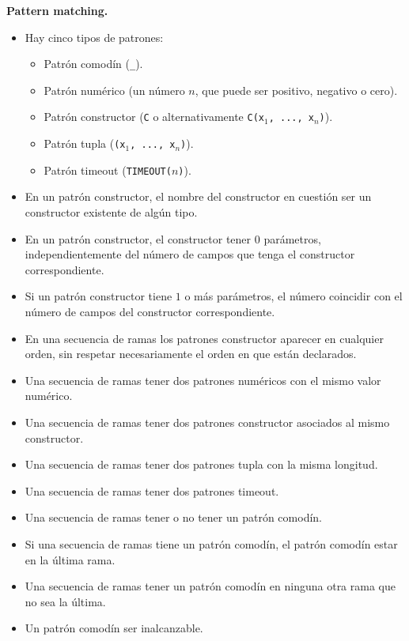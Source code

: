 \documentclass{article}
\begin{document}
{\bf Pattern matching.}
\begin{itemize}
\item Hay cinco tipos de patrones:
  \begin{itemize}
  \item Patr\'on comod\'in (\texttt{\_}).
  \item Patr\'on num\'erico (un n\'umero $n$, que puede ser positivo, negativo o cero).
  \item Patr\'on constructor (\texttt{C} o alternativamente \texttt{C(x$_1$, ..., x$_n$)}).
  \item Patr\'on tupla (\texttt{(x$_1$, ..., x$_n$)}).
  \item Patr\'on timeout (\texttt{TIMEOUT($n$)}).
  \end{itemize}
\item En un patr\'on constructor, el nombre del constructor en cuesti\'on \DEBE ser un constructor existente de
      alg\'un tipo.
\item En un patr\'on constructor, el constructor \PUEDE tener $0$ par\'ametros, independientemente del n\'umero
      de campos que tenga el constructor correspondiente.
\item Si un patr\'on constructor tiene $1$ o m\'as par\'ametros, el n\'umero \DEBE coincidir con el n\'umero
      de campos del constructor correspondiente.
\item En una secuencia de ramas los patrones constructor \PUEDEN aparecer en cualquier orden, sin respetar necesariamente el orden en que est\'an declarados.
\item Una secuencia de ramas \NOPUEDE tener dos patrones num\'ericos con el mismo valor num\'erico.    %
\item Una secuencia de ramas \NOPUEDE tener dos patrones constructor asociados al mismo constructor.
\item Una secuencia de ramas \NOPUEDE tener dos patrones tupla con la misma longitud.
\item Una secuencia de ramas \NOPUEDE tener dos patrones timeout.
\item Una secuencia de ramas \PUEDE tener o no tener un patr\'on comod\'in.
\item Si una secuencia de ramas tiene un patr\'on comod\'in, el patr\'on comod\'in \DEBE estar en la \'ultima rama.
\item Una secuencia de ramas \NOPUEDE tener un patr\'on comod\'in en ninguna otra rama que no sea la \'ultima.
\item Un patr\'on comod\'in \PUEDE ser inalcanzable.

\end{itemize}
\end{document}
